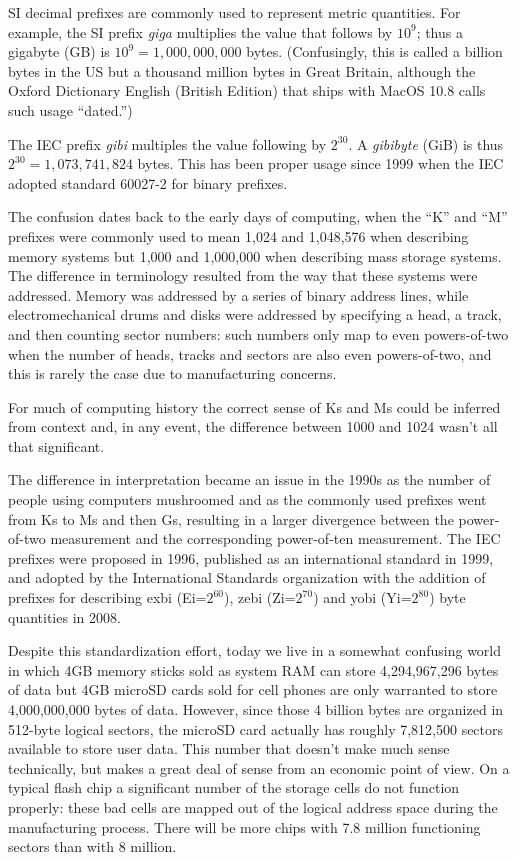 SI decimal prefixes are commonly used to represent metric
quantities. For example, the SI prefix \emph{giga} multiplies the value that follows by
$10^9$; thus a gigabyte (GB) is
$10^9=1,000,000,000$ bytes. (Confusingly, this is called a billion bytes
in the US but a thousand million bytes in Great Britain, although the
Oxford Dictionary English (British Edition) that ships with MacOS 10.8
calls such usage ``dated.'')

The IEC prefix \emph{gibi} multiples the value following by $2^{30}$. A \emph{gibibyte}
(GiB) is thus $2^{30}=1,073,741,824$ bytes. This has been proper usage
since 1999 when the IEC adopted standard 60027-2 for binary prefixes.

The confusion dates back to the early days of computing, when the ``K''
and ``M'' prefixes were commonly used to mean 1,024 and 1,048,576
when describing memory systems but 1,000 and 1,000,000 when
describing mass storage systems. The difference in terminology resulted
from the way that these systems were addressed. Memory was addressed
by a series of binary address lines, while electromechanical drums and
disks were addressed by specifying a head, a track, and then counting
sector numbers: such numbers only map to even powers-of-two when the
number of heads, tracks and sectors are also even powers-of-two, and
this is rarely the case due to manufacturing concerns.

For much of computing history the correct sense of Ks and Ms could be
inferred from context and, in any event, the difference between 1000
and 1024 wasn't all that significant.

The difference in interpretation became an issue in the 1990s as the
number of people using computers mushroomed and as the commonly used
prefixes went from Ks to Ms and then Gs, resulting in a larger
divergence between the power-of-two measurement and the corresponding
power-of-ten measurement. The IEC prefixes were proposed in
1996\cite{iec:1996},
published as an international standard in 1999, and adopted by the
International Standards organization with the addition of prefixes for
describing exbi (Ei=$2^{60}$), zebi (Zi=$2^{70}$) and yobi (Yi=$2^{80}$) byte
quantities in 2008\cite{iec:80000-13:2008}.  

Despite this standardization effort, today we live in a somewhat
confusing world in which 4GB memory sticks sold as system RAM can
store 4,294,967,296 bytes of data but 4GB microSD cards sold for cell
phones are only warranted to store 4,000,000,000 bytes of
data. However, since those 4 billion bytes are organized in 512-byte
logical sectors, the microSD card actually has roughly 7,812,500
sectors available to store user data. This number that  doesn't make much sense technically, but
makes a great deal of sense from an economic point of view. On a
typical flash chip a significant number of the storage cells do not
function properly: these bad cells are mapped out of the logical
address space during the manufacturing process. There will be more
chips with 7.8 million functioning sectors than with 8 million. 


